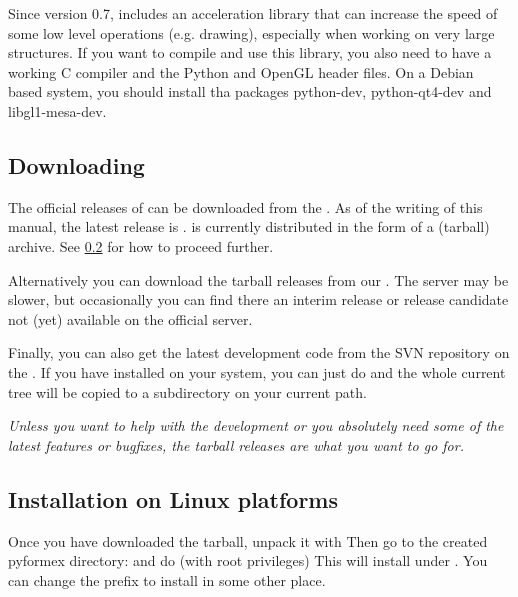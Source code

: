 Since version 0.7, \pyf includes an acceleration library that can increase the speed of some low level operations (e.g. drawing), especially when working on very large structures. If you want to compile and use this library, you also need to have a working C compiler and the Python and OpenGL header files. On a Debian based system, you should install tha packages python-dev, python-qt4-dev and libgl1-mesa-dev.

\subsection{Downloading}
\label{sec:downloading}
The official releases of \pyformex can be downloaded from the 
. As of the writing of this manual, the latest release is \htmladdnormallinkfoot{\pyfversion}{\latestpyf}. 
\pyformex is currently distributed in the form of a  (tarball) archive. See \ref{sec:installation-linux} for how to proceed further.

Alternatively you can download the tarball releases from our . The server may be slower, but occasionally you can find there an interim release or release candidate not (yet) available on the official server.

Finally, you can also get the latest development code from the SVN repository on the . If you have  installed on your system, you can just do
and the whole current \pyformex tree will be copied to a subdirectory  on your current path.

\emph{Unless you want to help with the development or you absolutely need some of the latest features or bugfixes, the tarball releases are what you want to go for. 
}


\subsection{Installation on Linux platforms}
\label{sec:installation-linux}
Once you have downloaded the \pyformex tarball, unpack it with
Then go to the created pyformex directory:
and do (with root privileges) 
This will install \pyformex under . You can change the prefix to install in some other place.

